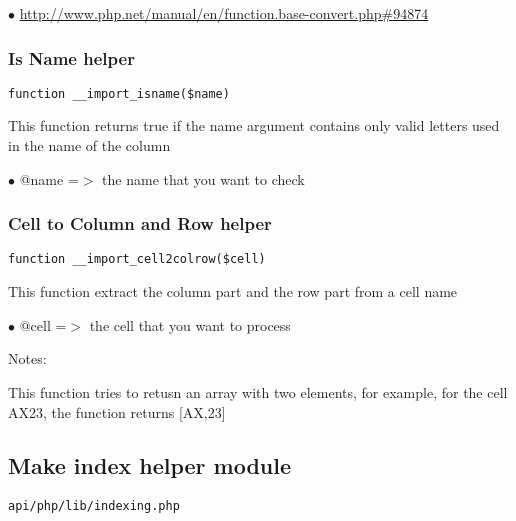 \documentclass[a4paper]{article}
\def\htmladdnormallink#1#2{\href{#2}{#1}}
\begin{document}
\begin{compactitem}
\item[\color{myblue}$\bullet$] \htmladdnormallink{http://www.php.net/manual/en/function.base-convert.php\#94874}{http://www.php.net/manual/en/function.base-convert.php\#94874}
\end{compactitem}

\hypertarget{toc479}{}
\subsubsection{Is Name helper}

\begin{lstlisting}
function __import_isname($name)
\end{lstlisting}

This function returns true if the name argument contains only valid letters
used in the name of the column

\begin{compactitem}
\item[\color{myblue}$\bullet$] @name =$>$ the name that you want to check
\end{compactitem}

\hypertarget{toc480}{}
\subsubsection{Cell to Column and Row helper}

\begin{lstlisting}
function __import_cell2colrow($cell)
\end{lstlisting}

This function extract the column part and the row part from a cell name

\begin{compactitem}
\item[\color{myblue}$\bullet$] @cell =$>$ the cell that you want to process
\end{compactitem}

Notes:

This function tries to retusn an array with two elements, for example, for
the cell AX23, the function returns [AX,23]

\hypertarget{toc481}{}
\subsection{Make index helper module}

\begin{lstlisting}
api/php/lib/indexing.php
\end{lstlisting}
\end{document}
